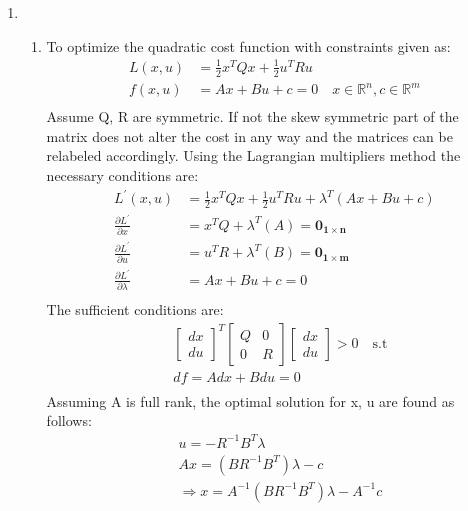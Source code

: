 \begin{enumerate}
  \item 
  \begin{enumerate}
   \item To optimize the quadratic cost function with constraints given as:
  \begin{align*}
    L(x,u) &= \frac{1}{2} x^T Q x + \frac{1}{2} u^T R u \\
    f(x,u) &= Ax + Bu + c = 0 \quad x \in \mathbb{R}^n, c \in \mathbb{R}^m\\
  \end{align*}
  Assume Q, R are symmetric. If not the skew symmetric part of the matrix does not alter the cost in any way and the matrices can be relabeled accordingly. Using the Lagrangian multipliers method the necessary conditions are:
  \begin{align*}
   L^\prime(x,u) &= \frac{1}{2} x^T  Q x + \frac{1}{2} u^T  R u + \lambda^T
(Ax+Bu+c)\\
   \frac{\partial L^\prime}{\partial x} &= x^T  Q  + \lambda^T (A) =
\mathbf{0_{1\times n}}\\
   \frac{\partial L^\prime}{\partial u} &= u^T  R  + \lambda^T (B) =
\mathbf{0_{1\times m}}\\
   \frac{\partial L^\prime}{\partial \lambda} &= Ax + Bu +c = 0 \\
  \end{align*}
  The sufficient conditions are:
  \begin{align*}
   &\begin{bmatrix}
    dx \\
    du
   \end{bmatrix}^T 
   \begin{bmatrix}
    Q & 0\\
    0 & R
   \end{bmatrix}
    \begin{bmatrix}
    dx \\
    du
   \end{bmatrix} > 0 \quad \text{s.t}\\
   &df = A dx + B du = 0\\
  \end{align*}
  Assuming A is full rank, the optimal solution for x, u are found as follows:
  \begin{align*}
   &u =  - R^{-1} B^T \lambda\\
   &A x =  (B R^{-1}B^T)\lambda -c \\
   &\Rightarrow x = A^{-1} (B R^{-1} B^T) \lambda -A^{-1} c\\

\end{align*}
\end{enumerate}
\end{enumerate}
